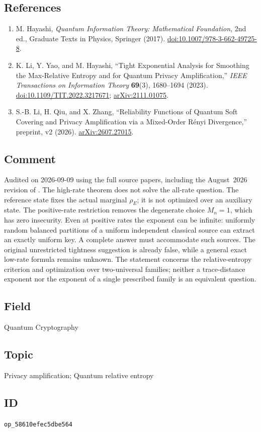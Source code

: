 \subsection*{References}

\begin{enumerate}[label={},leftmargin=4.8em,labelsep=0.5em]
  \footnotesize
  \item[\textup{[Hay17]}]\label{ref:h10-book}
  M. Hayashi, \emph{Quantum Information Theory: Mathematical Foundation}, 2nd ed., Graduate Texts in Physics, Springer (2017). \href{https://doi.org/10.1007/978-3-662-49725-8}{doi:10.1007/978-3-662-49725-8}.

  \item[\textup{[LYH23]}]\label{ref:h10-lyh}
  K. Li, Y. Yao, and M. Hayashi, ``Tight Exponential Analysis for Smoothing the Max-Relative Entropy and for Quantum Privacy Amplification,'' \emph{IEEE Transactions on Information Theory} \textbf{69}(3), 1680--1694 (2023). \href{https://doi.org/10.1109/TIT.2022.3217671}{doi:10.1109/TIT.2022.3217671}; \href{https://arxiv.org/abs/2111.01075}{arXiv:2111.01075}.

  \item[\textup{[LQZ26]}]\label{ref:h10-lqz}
  S.-B. Li, H. Qiu, and X. Zhang, ``Reliability Functions of Quantum Soft Covering and Privacy Amplification via a Mixed-Order R\'enyi Divergence,'' preprint, v2 (2026). \href{https://arxiv.org/abs/2607.27015}{arXiv:2607.27015}.
\end{enumerate}

\subsection*{Comment}

Audited on 2026-09-09 using the full source papers, including the August~2026 revision of . The high-rate theorem does not solve the all-rate question. The reference state fixes the actual marginal $\rho_E$; it is not optimized over an auxiliary state. The positive-rate restriction removes the degenerate choice $M_n=1$, which has zero insecurity. Even at positive rates the exponent can be infinite: uniformly random balanced partitions of a uniform independent classical source can extract an exactly uniform key. A complete answer must accommodate such sources. The original unrestricted tightness suggestion is already false, while a general exact low-rate formula remains unknown. The statement concerns the relative-entropy criterion and optimization over two-universal families; neither a trace-distance exponent nor the exponent of a single prescribed family is an equivalent question.

\subsection*{Field}

Quantum Cryptography

\subsection*{Topic}

Privacy amplification; Quantum relative entropy

\subsection*{ID}

\texttt{op\_58610efec5dbe564}
